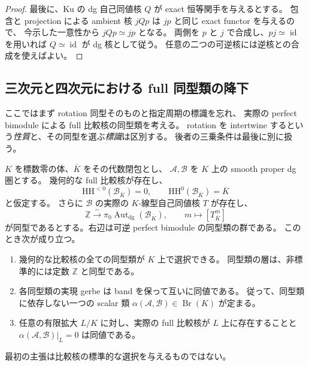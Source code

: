 \begin{proof}
最後に、Ku の dg 自己同値核 $Q$ が exact 恒等関手を与えるとする。
包含と projection による ambient 核 $jQp$ は $jp$ と同じ exact functor を与えるので、
今示した一意性から $jQp\simeq jp$ となる。
両側を $p$ と $j$ で合成し、$pj\simeq\operatorname{id}$ を用いれば
$Q\simeq\operatorname{id}$ が dg 核として従う。
任意の二つの可逆核には逆核との合成を使えばよい。
\end{proof}

\subsection{三次元と四次元における full 同型類の降下}

ここではまず rotation 同型そのものと指定周期の標識を忘れ、
実際の perfect bimodule による full 比較核の同型類を考える。
rotation を intertwine するという\emph{性質}と、その同型を選ぶ\emph{標識}は区別する。
後者の三乗条件は最後に別に扱う。

\begin{lemma}
\label{lem:nfm-cyclic-kernel-class-descent}
$K$ を標数零の体、$\overline K$ をその代数閉包とし、
$\mathcal A,\mathcal B$ を $K$ 上の smooth proper dg 圏とする。
幾何的な full 比較核が存在し、
\[
 \mathrm{HH}^{<0}(\mathcal B_{\overline K})=0,
 \qquad \mathrm{HH}^{0}(\mathcal B_{\overline K})=\overline K
\]
と仮定する。
さらに $\mathcal B$ の実際の $K$-線型自己同値核 $T$ が存在し、
\[
 \mathbb Z\xrightarrow{\sim}
 \pi_0\operatorname{Aut}_{\mathrm{dg}}(\mathcal B_{\overline K}),
 \qquad m\longmapsto[T^m_{\overline K}]
\]
が同型であるとする。右辺は可逆 perfect bimodule の同型類の群である。
このとき次が成り立つ。
\begin{enumerate}
\item 幾何的な比較核の全ての同型類が $K$ 上で選択できる。
同型類の層は、非標準的には定数 $\mathbb Z$ と同型である。
\item 各同型類の実現 gerbe は band を保って互いに同値である。
従って、同型類に依存しない一つの scalar 類
$\alpha(\mathcal A,\mathcal B)\in\operatorname{Br}(K)$ が定まる。
\item 任意の有限拡大 $L/K$ に対し、実際の full 比較核が $L$ 上に存在することと
$\alpha(\mathcal A,\mathcal B)|_L=0$ は同値である。
\end{enumerate}
最初の主張は比較核の標準的な選択を与えるものではない。
\end{lemma}

